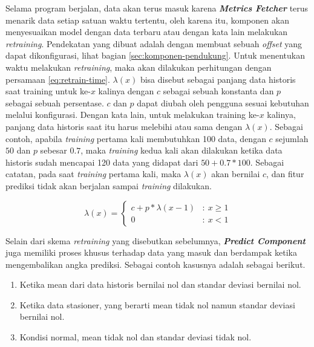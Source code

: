 Selama program berjalan, data akan terus masuk karena \textbf{\textit{Metrics Fetcher}} terus menarik data setiap satuan waktu tertentu, oleh karena itu, komponen akan menyesuaikan model dengan data terbaru atau dengan kata lain melakukan \textit{retraining}. Pendekatan yang dibuat adalah dengan membuat sebuah \textit{offset} yang dapat dikonfigurasi, lihat bagian \ref{sec:komponen-pendukung}. Untuk menentukan waktu melakukan \textit{retraining}, maka akan dilakukan perhitungan dengan persamaan \ref{eq:retrain-time}. $\lambda(x)$ bisa disebut sebagai panjang data historis saat training untuk ke-$x$ kalinya dengan $c$ sebagai sebuah konstanta dan $p$ sebagai sebuah persentase. $c$ dan $p$ dapat diubah oleh pengguna sesuai kebutuhan melalui konfigurasi. Dengan kata lain, untuk melakukan training ke-$x$ kalinya, panjang data historis saat itu harus melebihi atau sama dengan $\lambda(x)$. Sebagai contoh, apabila \textit{training} pertama kali membutuhkan 100 data, dengan $c$ sejumlah $50$ dan $p$ sebesar $0.7$, maka \textit{training} kedua kali akan dilakukan ketika data historis sudah mencapai 120 data yang didapat dari $50+0.7*100$. Sebagai catatan, pada saat \textit{training} pertama kali, maka $\lambda(x)$ akan bernilai $c$, dan fitur prediksi tidak akan berjalan sampai \textit{training} dilakukan.

\begin{equation}
    \label{eq:retrain-time}
    \lambda(x) =
        \left\{
        \begin{array}{cl}
            c + p*\lambda(x-1) & : \ x \geq 1 \\
            0 & : \ x < 1
        \end{array}
        \right.
\end{equation}

Selain dari skema \textit{retraining} yang disebutkan sebelumnya, \textbf{\textit{Predict Component}} juga memiliki proses khusus terhadap data yang masuk dan berdampak ketika mengembalikan angka prediksi. Sebagai contoh kasusnya adalah sebagai berikut.
\begin{enumerate}
    \item Ketika mean dari data historis bernilai nol dan standar deviasi bernilai nol.
    \item Ketika data stasioner, yang berarti mean tidak nol namun standar deviasi bernilai nol.
    \item Kondisi normal, mean tidak nol dan standar deviasi tidak nol.
\end{enumerate}


